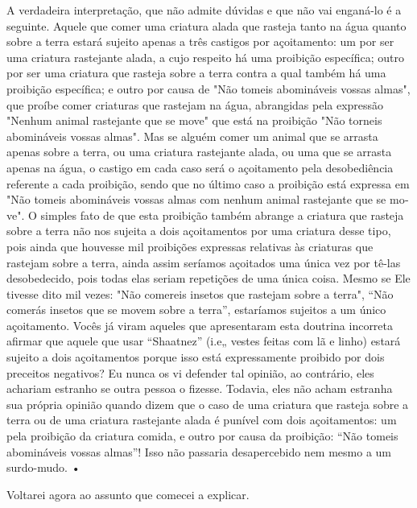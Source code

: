 A verdadeira interpretação, que não admite dúvidas e que não vai
enganá-lo é a seguinte. Aquele que comer uma criatura alada que rasteja
tanto na água quanto sobre a terra estará sujeito apenas a três castigos
por açoitamento: um por ser uma criatura rastejante alada, a cujo
respeito há uma proibição especí­fica; outro por ser uma criatura que
rasteja sobre a terra contra a qual também há uma proibição específica;
e outro por causa de "Não tomeis abomináveis vos­sas almas", que proíbe
comer criaturas que rastejam na água, abrangidas pela ex­pressão "Nenhum
animal rastejante que se move" que está na proibição "Não tor­neis
abomináveis vossas almas". Mas se alguém comer um animal que se arrasta
apenas sobre a terra, ou uma criatura rastejante alada, ou uma que se
arrasta ape­nas na água, o castigo em cada caso será o açoitamento pela
desobediência refe­rente a cada proibição, sendo que no último caso a
proibição está expressa em "Não tomeis abomináveis vossas almas com
nenhum animal rastejante que se mo­ve". O simples fato de que esta
proibição também abrange a criatura que rasteja sobre a terra não nos
sujeita a dois açoitamentos por uma criatura desse tipo, pois ainda que
houvesse mil proibições expressas relativas às criaturas que rastejam
sobre a terra, ainda assim seríamos açoitados uma única vez por tê-las
desobede­cido, pois todas elas seriam repetições de uma única coisa.
Mesmo se Ele tivesse dito mil vezes: "Não comereis insetos que rastejam
sobre a terra", ``Não comerás insetos que se movem sobre a terra'',
estaríamos sujeitos a um único açoitamento. Vocês já viram aqueles que
apresentaram esta doutrina incorreta afirmar que aquele que usar
``Shaatnez'' (i.e„ vestes feitas com lã e linho) estará sujeito a dois
açoita­mentos porque isso está expressamente proibido por dois preceitos
negativos? Eu nunca os vi defender tal opinião, ao contrário, eles
achariam estranho se outra pessoa o fizesse. Todavia, eles não acham
estranha sua própria opinião quando dizem que o caso de uma criatura que
rasteja sobre a terra ou de uma criatura rastejante alada é punível com
dois açoitamentos: um pela proibição da criatura comida, e outro por
causa da proibição: ``Não tomeis abomináveis vossas almas''! Isso não
passaria desapercebido nem mesmo a um surdo-mudo. •

Voltarei agora ao assunto que comecei a explicar.


